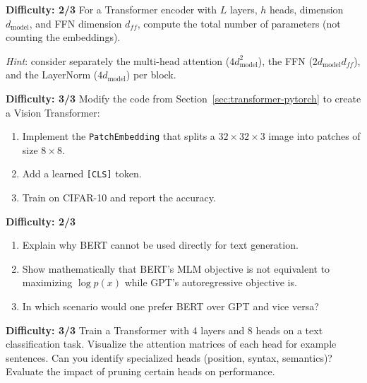 \begin{exercise}
\label{exo:transformer-params}
\textbf{Difficulty: 2/3}
For a Transformer encoder with $L$ layers, $h$ heads, dimension $d_{\text{model}}$, and FFN dimension $d_{ff}$, compute the total number of parameters (not counting the embeddings).

\emph{Hint}: consider separately the multi-head attention ($4 d_{\text{model}}^2$), the FFN ($2 d_{\text{model}} d_{ff}$), and the LayerNorm ($4 d_{\text{model}}$) per block.
\end{exercise}

\begin{exercise}
\label{exo:vit-impl}
\textbf{Difficulty: 3/3}
Modify the code from Section~\ref{sec:transformer-pytorch} to create a Vision Transformer:
\begin{enumerate}
    \item Implement the \texttt{PatchEmbedding} that splits a $32 \times 32 \times 3$ image into patches of size $8 \times 8$.
    \item Add a learned \texttt{[CLS]} token.
    \item Train on CIFAR-10 and report the accuracy.
\end{enumerate}
\end{exercise}

\begin{exercise}
\label{exo:bert-vs-gpt}
\textbf{Difficulty: 2/3}
\begin{enumerate}
    \item Explain why BERT cannot be used directly for text generation.
    \item Show mathematically that BERT's MLM objective is not equivalent to maximizing $\log p(x)$ while GPT's autoregressive objective is.
    \item In which scenario would one prefer BERT over GPT and vice versa?
\end{enumerate}
\end{exercise}

\begin{exercise}
\label{exo:attention-heads}
\textbf{Difficulty: 3/3}
Train a Transformer with 4 layers and 8 heads on a text classification task. Visualize the attention matrices of each head for example sentences. Can you identify specialized heads (position, syntax, semantics)? Evaluate the impact of pruning certain heads on performance.
\end{exercise}
